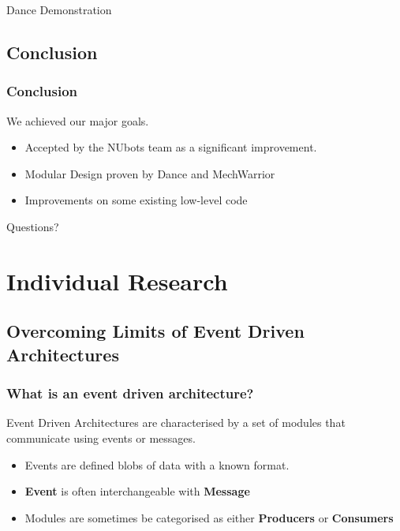 \documentclass{beamer}
\begin{document}
	\begin{frame}
		\huge Dance Demonstration
	\end{frame}
	
	\subsection{Conclusion} %
	\begin{frame}
		\frametitle{Conclusion}
			We achieved our major goals.
			\begin{itemize}
				\item Accepted by the NUbots team as a significant improvement.
				\item Modular Design proven by Dance and MechWarrior
				\item Improvements on some existing low-level code
			\end{itemize}
	\end{frame}	
	
	\begin{frame}
		\huge Questions?
	\end{frame}

\section{Individual Research}
\begin{frame}
	\sectionpage
\end{frame}

	\subsection{Overcoming Limits of Event Driven Architectures}
	\begin{frame}
		\subsectionpage
	\end{frame}
	
	\begin{frame}
		\frametitle{What is an event driven architecture?}
		
		Event Driven Architectures are characterised by a set of modules that communicate using events or messages.
		\begin{itemize}
			\item Events are defined blobs of data with a known format.
			\item \textbf{Event} is often interchangeable with \textbf{Message}
			\item Modules are sometimes be categorised as either \textbf{Producers} or \textbf{Consumers}
		\end{itemize}
	
	\end{frame}
	
\end{document}
